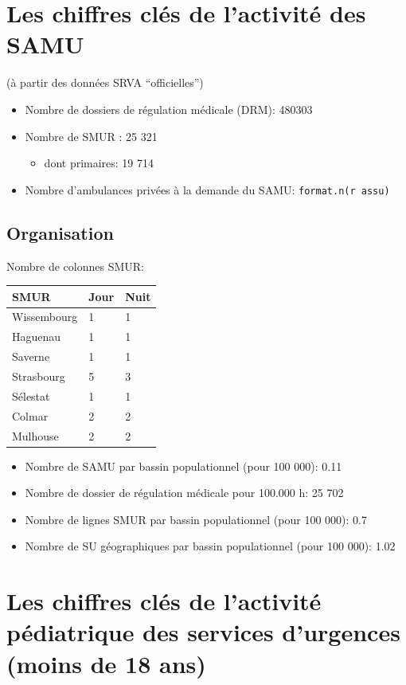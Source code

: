 \documentclass[]{article}
\begin{document}
\section{Les chiffres clés de l'activité des
SAMU}\label{les-chiffres-cles-de-lactivite-des-samu}

(à partir des données SRVA ``officielles'')

\begin{itemize}
\itemsep1pt\parskip0pt
\item
  Nombre de dossiers de régulation médicale (DRM): 480303
\item
  Nombre de SMUR : 25 321

  \begin{itemize}
  \itemsep1pt\parskip0pt
  \item
    dont primaires: 19 714
  \end{itemize}
\item
  Nombre d'ambulances privées à la demande du SAMU:
  \texttt{format.n(r assu)}
\end{itemize}

\subsection{Organisation}\label{organisation}

Nombre de colonnes SMUR:

\begin{longtable}[c]{@{}lll@{}}
\toprule
SMUR & Jour & Nuit\tabularnewline
\midrule
\endhead
Wissembourg & 1 & 1\tabularnewline
Haguenau & 1 & 1\tabularnewline
Saverne & 1 & 1\tabularnewline
Strasbourg & 5 & 3\tabularnewline
Sélestat & 1 & 1\tabularnewline
Colmar & 2 & 2\tabularnewline
Mulhouse & 2 & 2\tabularnewline
\bottomrule
\end{longtable}

\begin{itemize}
\itemsep1pt\parskip0pt
\item
  Nombre de SAMU par bassin populationnel (pour 100 000): 0.11
\item
  Nombre de dossier de régulation médicale pour 100.000 h: 25 702
\item
  Nombre de lignes SMUR par bassin populationnel (pour 100 000): 0.7
\item
  Nombre de SU géographiques par bassin populationnel (pour 100 000):
  1.02
\end{itemize}

\section{Les chiffres clés de l'activité pédiatrique des services
d'urgences (moins de 18
ans)}\label{les-chiffres-cles-de-lactivite-pediatrique-des-services-durgences-moins-de-18-ans}
\end{document}
